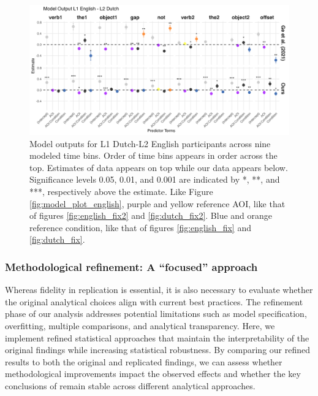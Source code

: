 \begin{figure}[H]  %
    \centering
    \includegraphics[width=\textwidth,height=\textheight,keepaspectratio]{viz/model_plot_dutch.png}
    \caption{Model outputs for L1 Dutch-L2 English participants across nine modeled time bins. Order of time bins appears in order across the top. Estimates of \textcite{ge2021a} data appears on top while our data appears below. Significance levels 0.05, 0.01, and 0.001 are indicated by *, **, and ***, respectively above the estimate. Like Figure \ref{fig:model_plot_english}, purple and yellow reference AOI, like that of figures \ref{fig:english_fix2} and \ref{fig:dutch_fix2}. Blue and orange reference condition, like that of figures \ref{fig:english_fix} and \ref{fig:dutch_fix}.}
    \label{fig:model_plot_dutch}
\end{figure}





\subsubsection{Methodological refinement: A “focused” approach}

Whereas fidelity in replication is essential, it is also necessary to evaluate whether the original analytical choices align with current best practices. The refinement phase of our analysis addresses potential limitations such as model specification, overfitting, multiple comparisons, and analytical transparency. Here, we implement refined statistical approaches that maintain the interpretability of the original findings while increasing statistical robustness. By comparing our refined results to both the original and replicated findings, we can assess whether methodological improvements impact the observed effects and whether the key conclusions of \textcite{ge2021a} remain stable across different analytical approaches.

